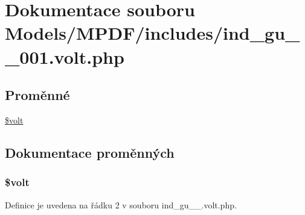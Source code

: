 \hypertarget{ind__gu__1__001_8volt_8php}{\section{Dokumentace souboru Models/\-M\-P\-D\-F/includes/ind\-\_\-gu\-\_\-\_\-001.volt.\-php}
\label{ind__gu__1__001_8volt_8php}
}
\subsection*{Proměnné}
\begin{DoxyCompactItemize}
\item 
\hyperlink{ind__gu__1__001_8volt_8php_a013d9bcd621d002433e25a82dd593989}{\$volt}
\end{DoxyCompactItemize}


\subsection{Dokumentace proměnných}
\hypertarget{ind__gu__1__001_8volt_8php_a013d9bcd621d002433e25a82dd593989}{
\subsubsection[{\$volt}]{\setlength{\rightskip}{0pt plus 5cm}\$volt}}\label{ind__gu__1__001_8volt_8php_a013d9bcd621d002433e25a82dd593989}


Definice je uvedena na řádku 2 v souboru ind\-\_\-gu\-\_\-\_.\-volt.\-php.

